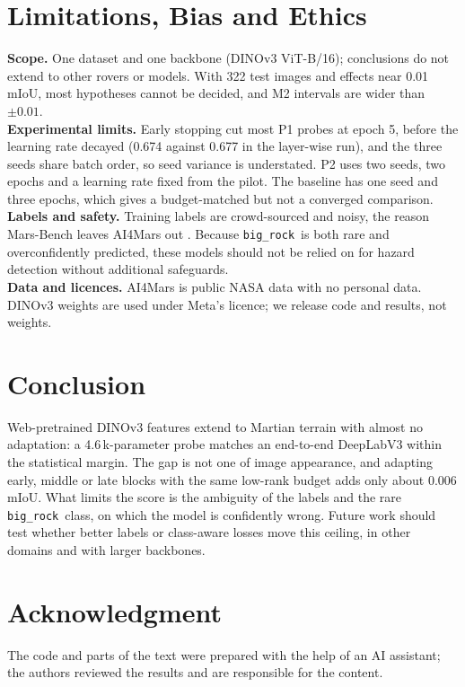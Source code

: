 \documentclass[conference]{IEEEtran}
\newcommand{\bigrock}{\texttt{big\_rock}}
\begin{document}
\section{Limitations, Bias and Ethics}\label{sec:limits}
\textbf{Scope.} One dataset and one backbone (DINOv3 ViT-B/16); conclusions do not extend to other rovers or models. With 322 test images and effects near 0.01 mIoU, most hypotheses cannot be decided, and M2 intervals are wider than $\pm0.01$.\\
\textbf{Experimental limits.} Early stopping cut most P1 probes at epoch 5, before the learning rate decayed (0.674 against 0.677 in the layer-wise run), and the three seeds share batch order, so seed variance is understated. P2 uses two seeds, two epochs and a learning rate fixed from the pilot. The baseline has one seed and three epochs, which gives a budget-matched but not a converged comparison.\\
\textbf{Labels and safety.} Training labels are crowd-sourced and noisy, the reason Mars-Bench leaves AI4Mars out \cite{purohit2025marsbench}. Because \bigrock\ is both rare and overconfidently predicted, these models should not be relied on for hazard detection without additional safeguards.\\
\textbf{Data and licences.} AI4Mars is public NASA data with no personal data. DINOv3 weights are used under Meta's licence; we release code and results, not weights.\\

\section{Conclusion}\label{sec:conclusion}
Web-pretrained DINOv3 features extend to Martian terrain with almost no adaptation: a 4.6\,k-parameter probe matches an end-to-end DeepLabV3 within the statistical margin. The gap is not one of image appearance, and adapting early, middle or late blocks with the same low-rank budget adds only about 0.006 mIoU. What limits the score is the ambiguity of the labels and the rare \bigrock\ class, on which the model is confidently wrong. Future work should test whether better labels or class-aware losses move this ceiling, in other domains and with larger backbones.

\section*{Acknowledgment}
The code and parts of the text were prepared with the help of an AI assistant; the authors reviewed the results and are responsible for the content.
\end{document}
